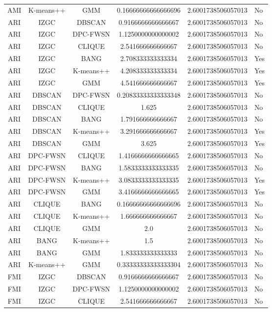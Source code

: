 \begin{table}[ht]
\begin{tabular}{cccc}
AMI & K-means++ & GMM & 0.16666666666666696 & 2.6001738506057013 & No\\
ARI & IZGC & DBSCAN & 0.9166666666666667 & 2.6001738506057013 & No\\
ARI & IZGC & DPC-FWSN & 1.1250000000000002 & 2.6001738506057013 & No\\
ARI & IZGC & CLIQUE & 2.541666666666667 & 2.6001738506057013 & No\\
ARI & IZGC & BANG & 2.708333333333334 & 2.6001738506057013 & Yes\\
ARI & IZGC & K-means++ & 4.208333333333334 & 2.6001738506057013 & Yes\\
ARI & IZGC & GMM & 4.541666666666667 & 2.6001738506057013 & Yes\\
ARI & DBSCAN & DPC-FWSN & 0.20833333333333348 & 2.6001738506057013 & No\\
ARI & DBSCAN & CLIQUE & 1.625 & 2.6001738506057013 & No\\
ARI & DBSCAN & BANG & 1.791666666666667 & 2.6001738506057013 & No\\
ARI & DBSCAN & K-means++ & 3.291666666666667 & 2.6001738506057013 & Yes\\
ARI & DBSCAN & GMM & 3.625 & 2.6001738506057013 & Yes\\
ARI & DPC-FWSN & CLIQUE & 1.4166666666666665 & 2.6001738506057013 & No\\
ARI & DPC-FWSN & BANG & 1.5833333333333335 & 2.6001738506057013 & No\\
ARI & DPC-FWSN & K-means++ & 3.0833333333333335 & 2.6001738506057013 & Yes\\
ARI & DPC-FWSN & GMM & 3.4166666666666665 & 2.6001738506057013 & Yes\\
ARI & CLIQUE & BANG & 0.16666666666666696 & 2.6001738506057013 & No\\
ARI & CLIQUE & K-means++ & 1.666666666666667 & 2.6001738506057013 & No\\
ARI & CLIQUE & GMM & 2.0 & 2.6001738506057013 & No\\
ARI & BANG & K-means++ & 1.5 & 2.6001738506057013 & No\\
ARI & BANG & GMM & 1.833333333333333 & 2.6001738506057013 & No\\
ARI & K-means++ & GMM & 0.33333333333333304 & 2.6001738506057013 & No\\
FMI & IZGC & DBSCAN & 0.9166666666666667 & 2.6001738506057013 & No\\
FMI & IZGC & DPC-FWSN & 1.1250000000000002 & 2.6001738506057013 & No\\
FMI & IZGC & CLIQUE & 2.541666666666667 & 2.6001738506057013 & No\\

\end{tabular}
\end{table}
